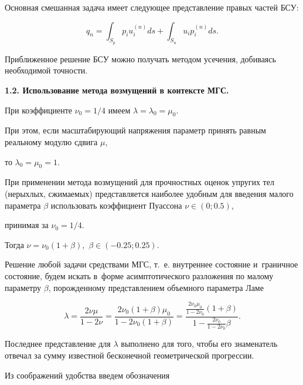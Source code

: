 Основная смешанная задача имеет следующее представление правых частей БСУ:

\begin{equation} \label{eq:ulg:Novi_eq010} 

{{q}_{n}}=\int _{{{S}_{p}}}{ {{p}_{i}} u_{i}^{(n)}ds}+\int _{{{S}_{u}}}{ {{u}_{i}} p_{i}^{(n)}ds}. 

\end{equation}



Приближенное решение БСУ можно получать методом усечения, добиваясь необходимой точности.



\smallskip



\textbf{1.2. Использование метода возмущений в контексте МГС.} 

При коэффициенте $\nu _{0} =1/4$ имеем $\lambda =\lambda _{0} =\mu _{0} $. 

При этом, если масштабирующий напряжения параметр принять равным реальному модулю сдвига $\mu $, 

то $\lambda _{0} =\mu _{0} =1$. 

При применении метода возмущений для прочностных оценок упругих тел (нерыхлых, сжимаемых) представляется наиболее удобным для введения малого параметра $\beta $ использовать коэффициент Пуассона $\nu \in (0; 0.5)$, 

принимая за $\nu _{0} =1/4$. 

Тогда $\nu =\nu _{0} (1+\beta ),$ $\beta \in (-0.25; 0.25)$. 

Решение любой задачи средствами МГС, т.~е. внутреннее состояние и~граничное состояние, будем искать в~форме асимптотического разложения по малому параметру $\beta $, порожденному представлением объемного параметра Ламе

\[

\lambda =\frac{2\nu   \mu }{1-2\nu }=\frac{2\nu _{0} (1+\beta )\mu _{0} }{1-2\nu _{0} (1+\beta )} =

\frac{\frac{2\nu _{0} \mu _{0} }{1-2\nu _{0} } (1+\beta )}{1-\frac{2\nu _{0} }{1-2\nu _{0} } \beta } .

\]



Последнее представление для $\lambda$ выполнено для того, чтобы его знаменатель отвечал за сумму известной бесконечной геометрической прогрессии.



Из соображений удобства введем обозначения   

